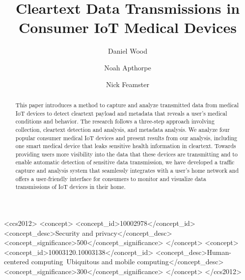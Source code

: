 \documentclass[sigconf]{acmart}
\begin{document}
\title{Cleartext Data Transmissions in Consumer IoT Medical Devices}


\author{Daniel Wood}

\author{Noah Apthorpe}

\author{Nick Feamster}


\renewcommand{\shortauthors}{D. Wood et al.}

\begin{abstract}
This paper introduces a method to
capture and analyze transmitted data from medical IoT devices to detect cleartext
payload and metadata that reveals a user's
medical conditions and
behavior. 
The research follows a three-step approach involving collection, cleartext detection
and analysis, and metadata analysis. 
We analyze four popular consumer medical IoT devices and present 
results from our analysis, including one smart medical device that leaks sensitive
health information in cleartext. 
Towards providing users more visibility into the data that these devices are transmitting
and to enable automatic detection of sensitive data transmission,
we have developed a traffic capture and analysis system that seamlessly integrates
with a user's home network and offers
a user-friendly interface for consumers to monitor and visualize data transmissions
of IoT devices in their home. 
\end{abstract}

%
%
\begin{CCSXML}
<ccs2012>
<concept>
<concept_id>10002978</concept_id>
<concept_desc>Security and privacy</concept_desc>
<concept_significance>500</concept_significance>
</concept>
<concept>
<concept_id>10003120.10003138</concept_id>
<concept_desc>Human-centered computing~Ubiquitous and mobile computing</concept_desc>
<concept_significance>300</concept_significance>
</concept>
</ccs2012>
\end{CCSXML}





\maketitle




 
\end{document}
